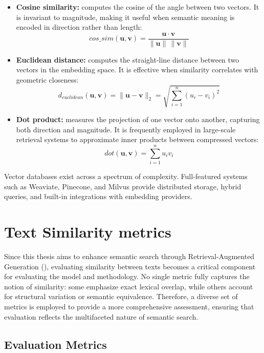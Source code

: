 \begin{itemize}
    \item \textbf{Cosine similarity:} computes the cosine of the angle between two vectors. It is invariant to magnitude, making it useful when semantic meaning is encoded in direction rather than length:  
    \[
        \textit{cos\_sim}(\mathbf{u}, \mathbf{v}) = \frac{\mathbf{u} \cdot \mathbf{v}}{\|\mathbf{u}\| \, \|\mathbf{v}\|}
    \]
    
    \item \textbf{Euclidean distance:} computes the straight-line distance between two vectors in the embedding space. It is effective when similarity correlates with geometric closeness:  
    \[
        d_{\textit{euclidean}}(\mathbf{u}, \mathbf{v}) = \|\mathbf{u} - \mathbf{v}\|_2 = \sqrt{\sum_{i=1}^n (u_i - v_i)^2}
    \]
    
    \item \textbf{Dot product:} measures the projection of one vector onto another, capturing both direction and magnitude. It is frequently employed in large-scale retrieval systems to approximate inner products between compressed vectors:  
    \[
        \textit{dot}(\mathbf{u}, \mathbf{v}) = \sum_{i=1}^n u_i v_i
    \]
\end{itemize}


Vector databases exist across a spectrum of complexity. Full-featured systems such as Weaviate, Pinecone, and Milvus provide distributed storage, hybrid queries, and built-in integrations with embedding providers.

\section{Text Similarity metrics}
Since this thesis aims to enhance semantic search through Retrieval-Augmented Generation (), 
evaluating similarity between texts becomes a critical component for evaluating the model and methodology. 
No single metric fully captures the notion of similarity: some emphasize exact lexical overlap, 
while others account for structural variation or semantic equivalence. 
Therefore, a diverse set of metrics is employed to provide a more comprehensive assessment, 
ensuring that evaluation reflects the multifaceted nature of semantic search.

\subsection{Evaluation Metrics}

